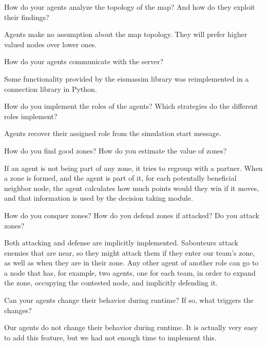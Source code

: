\begin{question}
How do your agents analyze the topology of the map? And how do they exploit
their findings? 
\end{question}

Agents make no assumption about the map topology. They will
prefer higher valued nodes over lower ones.


\begin{question}
How do your agents communicate with the server?  
\end{question}

Some functionality
provided by the eismassim library was reimplemented in a connection library in
Python.

\begin{question}
How do you implement the roles of the agents? Which strategies do the
different roles implement?  
\end{question}

Agents recover their assigned role from the
simulation start message.  

\begin{question}
How do you find good zones? How do you estimate the value of zones?  
\end{question}

If an
agent is not being part of any zone, it tries to regroup with a partner.  When
a zone is formed, and the agent is part of it, for each potentally beneficial
neighbor node, the agent calculates how much points would they win if it
moves, and that information is used by the decision taking module.

\begin{question}
How do you conquer zones? How do you defend zones if attacked? Do you
attack zones?  
\end{question}

Both attacking and defense are implicitly implemented.
Sabouteurs attack enemies that are near, so they might attack them if they
enter our team's zone, as well as when they are in their zone. Any other agent
of another role can go to a node that has, for example, two agents, one for
each team, in order to expand the zone, occupying the contested node, and
implicitly defending it.

\begin{question}
Can your agents change their behavior during runtime? If so, what triggers
the changes?  
\end{question}

Our agents do not change their behavior during runtime. It is
actually very easy to add this feature, but we had not enough time to
implement this.

